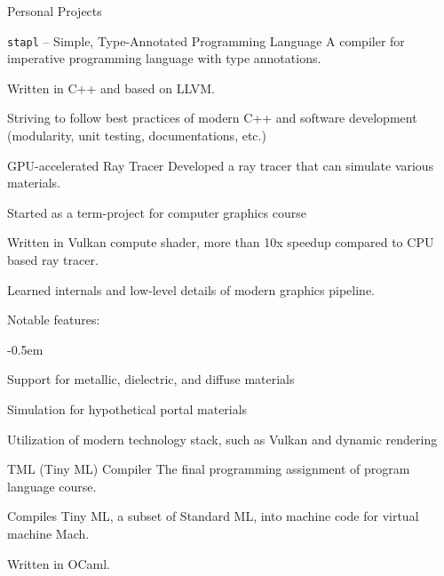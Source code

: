\documentclass{resume}
\begin{document}
\begin{res-section}{Personal Projects}
  \begin{res-subsection}{\texttt{stapl} -- Simple, Type-Annotated Programming Language}{}
    A compiler for imperative programming language with type annotations.

    \item Written in C++ and based on LLVM.

    \item Striving to follow best practices of modern C++ and software development (modularity, unit testing, documentations, etc.)
  \end{res-subsection}

  \begin{res-subsection}{GPU-accelerated Ray Tracer}{}
    Developed a ray tracer that can simulate various materials.

    \item Started as a term-project for computer graphics course

    \item Written in Vulkan compute shader, more than 10x speedup compared to CPU based ray tracer.

    \item Learned internals and low-level details of modern graphics pipeline.

    \item Notable features:
    \vspace{-0.5em}
    \begin{list}{--}{}
      \itemsep -0.5em
      \item Support for metallic, dielectric, and diffuse materials
      \item Simulation for hypothetical portal materials
      \item Utilization of modern technology stack, such as Vulkan and dynamic rendering
    \end{list}
  \end{res-subsection}

  \begin{res-subsection}{TML (Tiny ML) Compiler}{}
    The final programming assignment of program language course.

    \item Compiles Tiny ML, a subset of Standard ML, into machine code for virtual machine \textsf{Mach}.

    \item Written in OCaml.


\end{res-subsection}
\end{res-section}
\end{document}

